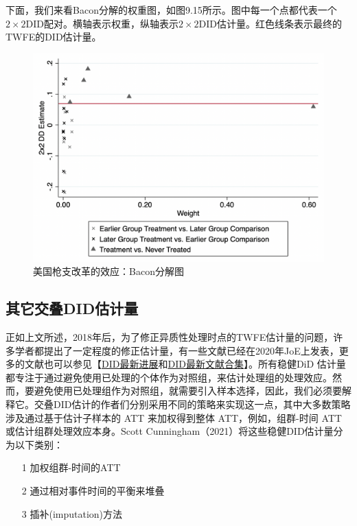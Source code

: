 \documentclass[cn,12pt,math=newtx,citestyle=gb7714-2015,bibstyle=gb7714-2015]{elegantbook}
\begin{document}
    下面，我们来看Bacon分解的权重图，如图9.15所示。图中每一个点都代表一个$2 \times 2$DID配对。横轴表示权重，纵轴表示$2 \times 2$DID估计量。红色线条表示最终的TWFE的DID估计量。
    
    
    \begin{figure}[tbph]
    	\centering
    	\includegraphics[width=1\linewidth]{cdl_bacon_decomp}
    	\caption{美国枪支改革的效应：Bacon分解图}
    	\label{fig:cdl_bacon_decomp}
    \end{figure}
    
    \subsection{其它交叠DID估计量}
    
	正如上文所述，2018年后，为了修正异质性处理时点的TWFE估计量的问题，许多学者都提出了一定程度的修正估计量，有一些文献已经在2020年JoE上发表，更多的文献也可以参见【\href{https://asjadnaqvi.github.io/DiD}{DID最新进展}和\href{https://christinecai.github.io/PublicGoods/applied_micro_methods.pdf}{DID最新文献合集}】。所有稳健DiD 估计量都专注于通过避免使用已处理的个体作为对照组，来估计处理组的处理效应。然而，要避免使用已处理组作为对照组，就需要引入样本选择，因此，我们必须要解释它。交叠DID估计的作者们分别采用不同的策略来实现这一点，其中大多数策略涉及通过基于估计子样本的 ATT 来加权得到整体 ATT，例如，组群-时间 ATT 或估计组群处理效应本身。Scott Cunningham（2021）将这些稳健DID估计量分为以下类别：
	
	\begin{itemize}
		\item [1] 加权组群-时间的ATT
		\item [2] 通过相对事件时间的平衡来堆叠
		\item [3] 插补(imputation)方法
	\end{itemize}
	
\end{document}
